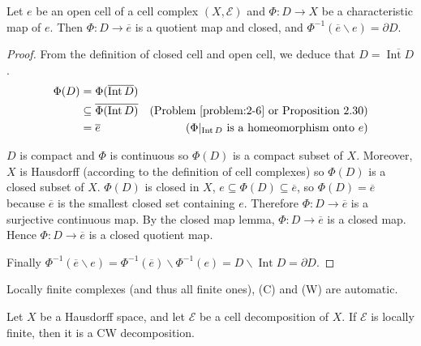 \begin{note}\label{note:characteristic-map-as-a-quotient-map}
	Let \( e \) be an open cell of a cell complex \( (X, \mathscr{E}) \) and \( \Phi: D \to X \) be a characteristic map of \( e \). Then \( \Phi: D \to \overline{e} \) is a quotient map and closed, and \( \Phi^{-1}(\overline{e}\smallsetminus e) = \partial D \).
\end{note}

\begin{proof}
	From the definition of closed cell and open cell, we deduce that \( D = \overline{\operatorname{Int} D} \).
	\begin{align*}
		\Phi(D) & = \Phi(\overline{\operatorname{Int} D})                                                                                               \\
		        & \subseteq \overline{\Phi(\operatorname{Int} D)} & \text{(Problem~\ref{problem:2-6} or Proposition 2.30)}                              \\
		        & = \overline{e}                                  & \text{(\(  \Phi\vert_{\operatorname{Int} D}  \) is a homeomorphism onto \(  e  \))}
	\end{align*}

	\( D \) is compact and \( \Phi \) is continuous so \( \Phi(D) \) is a compact subset of \( X \). Moreover, \( X \) is Hausdorff (according to the definition of cell complexes) so \( \Phi(D) \) is a closed subset of \( X \). \( \Phi(D) \) is closed in \( X \), \( e\subseteq \Phi(D) \subseteq \overline{e} \), so \( \Phi(D) = \overline{e} \) because \( \overline{e} \) is the smallest closed set containing \( e \). Therefore \( \Phi: D \to \overline{e} \) is a surjective continuous map. By the closed map lemma, \( \Phi: D \to \overline{e} \) is a closed map. Hence \( \Phi: D \to \overline{e} \) is a closed quotient map.

	Finally \( \Phi^{-1}(\overline{e}\smallsetminus e) = \Phi^{-1}(\overline{e}) \smallsetminus \Phi^{-1}(e) = D \smallsetminus \operatorname{Int} D = \partial D \).
\end{proof}

Locally finite complexes (and thus all finite ones), (C) and (W) are automatic.

\begin{prop}{5.4}
	Let \( X \) be a Hausdorff space, and let \( \mathscr{E} \) be a cell decomposition of \( X \). If \( \mathscr{E} \) is locally finite, then it is a CW decomposition.
\end{prop}


